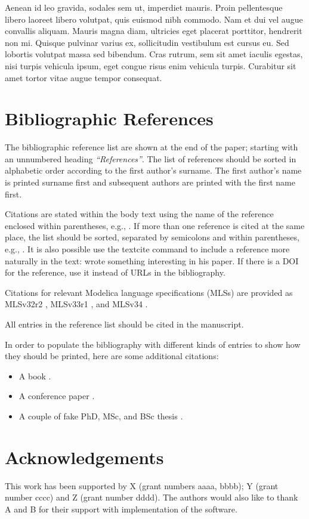 \documentclass{modelica}
\begin{document}
Aenean id leo gravida, sodales sem ut, imperdiet mauris. Proin pellentesque libero laoreet libero volutpat, quis euismod nibh commodo. Nam et dui vel augue convallis aliquam. Mauris magna diam, ultricies eget placerat porttitor, hendrerit non mi. Quisque pulvinar varius ex, sollicitudin vestibulum est cursus eu. Sed lobortis volutpat massa sed bibendum. Cras rutrum, sem sit amet iaculis egestas, nisi turpis vehicula ipsum, eget congue risus enim vehicula turpis. Curabitur sit amet tortor vitae augue tempor consequat.

\section{Bibliographic References}
The bibliographic reference list are shown at the end of the paper;
starting with an unnumbered heading \emph{``References''}. The list of
references should be sorted in alphabetic order according to the first
author's surname.
The first author's name is printed surname first and subsequent authors are printed with the first name first.

Citations are stated within the body text using the name of the
reference enclosed within parentheses, e.g., \cite{Pantelides:1988}. If
more than one reference is cited at the same place, the list should be
sorted, separated by semicolons and within parentheses, e.g.,
\cite{DuffReid:1978,Pierce:2002,Plotkin:1981}.
It is also possible use the textcite command to include a reference more naturally in the text: \textcite{Pantelides:1988} wrote something interesting in his paper.
If there is a DOI for the reference, use it instead of URLs in the bibliography.

Citations for relevant Modelica language specifications (MLSs) are provided as
MLSv32r2 \cite{MLSv32r2}, MLSv33r1 \cite{MLSv33r1}, and MLSv34 \cite{MLSv34}.

All entries in the reference list should be cited in the manuscript.

In order to populate the bibliography with different kinds of entries to show how they should be printed, here are some additional citations:

\begin{itemize}
\item A book \cite{Kernighan:1988}.
\item A conference paper \cite{colaco:2003}.
\item A couple of fake PhD, MSc, and BSc thesis \cite{Doe:PhD,Doe:MSc,Doe:BSc}.
\end{itemize}

\section*{Acknowledgements}

This work has been supported by X (grant numbers aaaa, bbbb); Y (grant number cccc) and Z (grant number dddd).
The authors would also like to thank A and B for their support with implementation of the software.

\printbibliography
\end{document}
